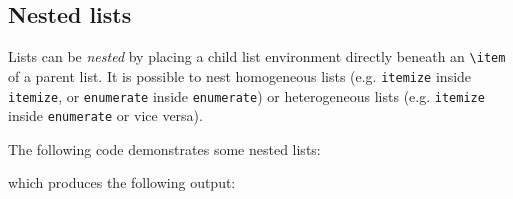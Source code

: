 	\subsection{Nested lists}
		Lists can be \emph{nested} by placing a child list environment directly beneath an \lstinline|\item| of a parent list. It is possible to nest homogeneous lists (e.g. \verb|itemize| inside \verb|itemize|, or \verb|enumerate| inside \verb|enumerate|) or heterogeneous lists (e.g. \verb|itemize| inside \verb|enumerate| or vice versa).
		
		The following code demonstrates some nested lists:

		which produces the following output:
